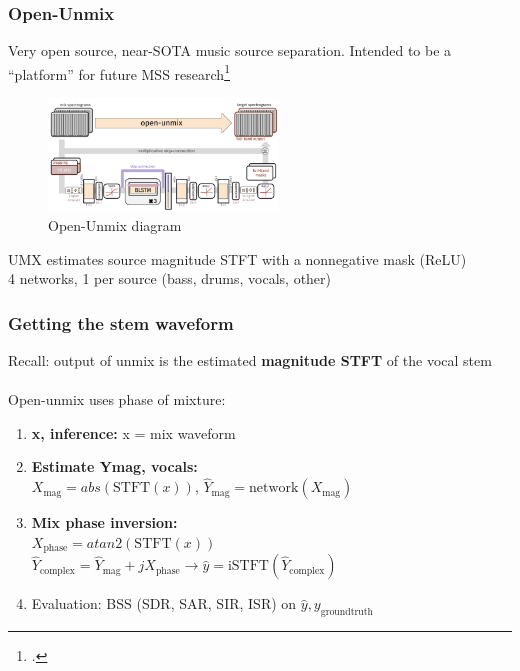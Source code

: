 \documentclass[usenames,dvipsnames]{beamer}
\begin{document}
\begin{frame}
	\frametitle{Open-Unmix}
	Very open source, near-SOTA music source separation. Intended to be a ``platform'' for future MSS research\footcite{umx}
	\begin{figure}[ht]
		\includegraphics[height=3cm]{./umx1.png}
		\caption{Open-Unmix diagram}
	\end{figure}
	UMX estimates source magnitude STFT with a nonnegative mask (ReLU)\\
	4 networks, 1 per source (bass, drums, vocals, other)
\end{frame}

\begin{frame}
	\frametitle{Getting the stem waveform}
	Recall: output of unmix is the estimated \textbf{magnitude STFT} of the vocal stem\\\ \\

	Open-unmix uses phase of mixture:
	\begin{enumerate}
		\item
			\textbf{x, inference:} x = mix waveform
		\item
			\textbf{Estimate Ymag, vocals:}\\
			\qquad $X_{\text{mag}} = abs(\text{STFT}(x))$, $\hat{Y}_{\text{mag}} = \text{network}(X_{\text{mag}})$
		\item
			\textbf{Mix phase inversion:}\\
			\qquad $X_{\text{phase}} = atan2(\text{STFT}(x))$\\
			\qquad $\hat{Y}_{\text{complex}} = \hat{Y}_{\text{mag}} + j X_{\text{phase}} \rightarrow \hat{y} = \text{iSTFT}(\hat{Y}_{\text{complex}})$
		\item
			Evaluation: BSS (SDR, SAR, SIR, ISR) on $\hat{y}, y_{\text{groundtruth}}$
	\end{enumerate}
\end{frame}
\end{document}
